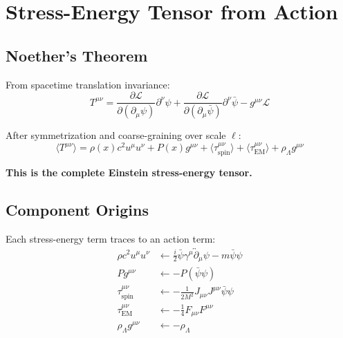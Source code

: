 \documentclass[11pt,a4paper]{article}
\theoremstyle{definition}
\theoremstyle{remark}
\begin{document}
	\section{Stress-Energy Tensor from Action}
	
	\subsection{Noether's Theorem}
	
	From spacetime translation invariance:
	\begin{equation}
		T^{\mu\nu} = \frac{\partial\mathcal{L}}{\partial(\partial_\mu\psi)}\partial^\nu\psi + \frac{\partial\mathcal{L}}{\partial(\partial_\mu\bar{\psi})}\partial^\nu\bar{\psi} - g^{\mu\nu}\mathcal{L}
	\end{equation}
	
	After symmetrization and coarse-graining over scale $\ell$:
	\begin{equation}
		\boxed{\langle T^{\mu\nu}\rangle = \rho(x)c^2 u^\mu u^\nu + P(x)g^{\mu\nu} + \langle\tau^{\mu\nu}_{\mathrm{spin}}\rangle + \langle\tau^{\mu\nu}_{\mathrm{EM}}\rangle + \rho_\Lambda g^{\mu\nu}}
		\label{eq:stress_energy_full}
	\end{equation}
	
	\textbf{This is the complete Einstein stress-energy tensor.}
	
	\subsection{Component Origins}
	
	Each stress-energy term traces to an action term:
	\begin{align}
		\rho c^2 u^\mu u^\nu &\leftarrow \tfrac{i}{2}\bar{\psi}\gamma^\mu\overleftrightarrow{\partial}_\mu\psi - m\bar{\psi}\psi \\
		Pg^{\mu\nu} &\leftarrow -P(\bar{\psi}\psi) \\
		\tau^{\mu\nu}_{\mathrm{spin}} &\leftarrow -\tfrac{1}{2M^2}J_{\mu\nu}J^{\mu\nu}\bar{\psi}\psi \\
		\tau^{\mu\nu}_{\mathrm{EM}} &\leftarrow -\tfrac{1}{4}F_{\mu\nu}F^{\mu\nu} \\
		\rho_\Lambda g^{\mu\nu} &\leftarrow -\rho_\Lambda
	\end{align}
	
\end{document}
